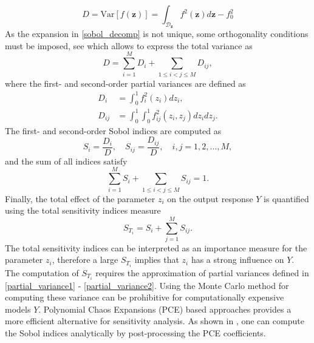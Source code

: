 \documentclass[review]{elsarticle}
\numberwithin{equation}{section}
\numberwithin{equation}{section}
\begin{document}
\begin{equation}\label{tot_var}
D = \text{Var}[f(\mathbf{z})] = \int_{\mathcal{D}_{\mathbf{z}}} f^2(\mathbf{z})d\mathbf{z} - f_0^2
\end{equation}
As the expansion in \eqref{sobol_decomp} is not unique, some orthogonality conditions must be imposed, see \cite{Rabitz1999,SOBOL2001271} which allows to express the total variance as
\begin{equation}
D = \sum_{i=1}^M D_i + \sum_{1\leq i<j\leq M} D_{ij},
\end{equation}
where the first- and second-order partial variances are defined as
\begin{align}
D_i &= \int_{0}^{1} f^2_i(z_i)dz_i, \label{partial_variance1}\\
D_{ij} &= \int_{0}^{1} \int_{0}^{1} f^2_{ij}(z_i,z_j)dz_idz_j \label{partial_variance2}. 
\end{align}
The first- and second-order Sobol indices are computed as
\begin{equation}\label{sobol_ind}
S_i = \frac{D_i}{D}, \quad S_{ij} = \frac{D_{ij}}{D}, \quad i,j=1,2, ..., M,
\end{equation}
and the sum of all indices satisfy
\begin{equation}
\sum_{i=1}^M S_i + \sum_{1\leq i<j\leq M} S_{ij} = 1.
\end{equation}
Finally, the total effect of the parameter $z_i$ on the output response $Y$ is quantified using the total sensitivity indices measure
\begin{equation}
S_{T_i} = S_i + \sum_{j=1}^M S_{ij}.
\end{equation}
The total sensitivity indices can be interpreted as an importance measure for the parameter $z_i$, therefore a large $S_{T_i}$ implies that $z_i$ has a strong influence on $Y$. The computation of $S_{T_i}$ requires the approximation of partial variances defined in \eqref{partial_variance1} - \eqref{partial_variance2}. Using the Monte Carlo method for computing these variance can be prohibitive for computationally expensive models $Y$. Polynomial Chaos Expansions (PCE) based approaches provides a more efficient alternative for sensitivity analysis. As shown in \cite{SUDRET2008964}, one can compute the Sobol indices analytically by post-processing the PCE coefficients.
\end{document}
